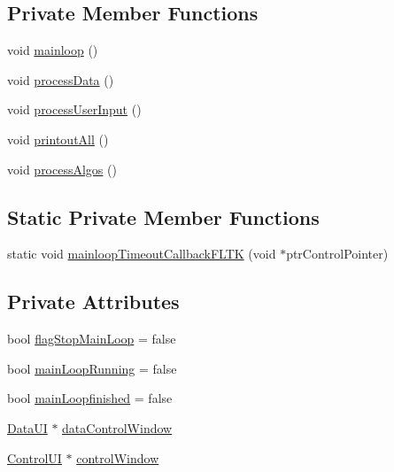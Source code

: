 \subsection*{Private Member Functions}
\begin{DoxyCompactItemize}
\item 
void \hyperlink{class_mike_1_1_control_a3440083f03f7da3d4490fa44bc13d62b}{mainloop} ()
\item 
void \hyperlink{class_mike_1_1_control_a887652b2503a6e881fcceca36f0a0af9}{process\+Data} ()
\item 
void \hyperlink{class_mike_1_1_control_ad06eaf996f971a758eea1fd55eda2565}{process\+User\+Input} ()
\item 
void \hyperlink{class_mike_1_1_control_a2f239c6bace6fba6d31d54919b7ee6e1}{printout\+All} ()
\item 
void \hyperlink{class_mike_1_1_control_acf3d41cb5dd54a2ee31cfb0709a79e7e}{process\+Algos} ()
\end{DoxyCompactItemize}
\subsection*{Static Private Member Functions}
\begin{DoxyCompactItemize}
\item 
static void \hyperlink{class_mike_1_1_control_ac627d3cc73f39181fbfabfa01eb47f85}{mainloop\+Timeout\+Callback\+F\+L\+TK} (void $\ast$ptr\+Control\+Pointer)
\end{DoxyCompactItemize}
\subsection*{Private Attributes}
\begin{DoxyCompactItemize}
\item 
bool \hyperlink{class_mike_1_1_control_a800d1dc7b58dc3af7c081225009c898f}{flag\+Stop\+Main\+Loop} = false
\item 
bool \hyperlink{class_mike_1_1_control_af17a58f80bda54fda5b0a5167c8f04ed}{main\+Loop\+Running} = false
\item 
bool \hyperlink{class_mike_1_1_control_a7749b97976e1bb3e7ea49c7d63531dfc}{main\+Loopfinished} = false
\item 
\hyperlink{class_mike_1_1_control_addbe39ef40982f0a4002b6f74091a799}{Data\+UI} $\ast$ \hyperlink{class_mike_1_1_control_aaf1b458116247ebada43f8bb8faf3edf}{data\+Control\+Window}
\item 
\hyperlink{class_mike_1_1_control_aba56a17e2d16d087731d215476fff47d}{Control\+UI} $\ast$ \hyperlink{class_mike_1_1_control_ace0a737869d8dadfadc7cd0c191af872}{control\+Window}
\end{DoxyCompactItemize}


